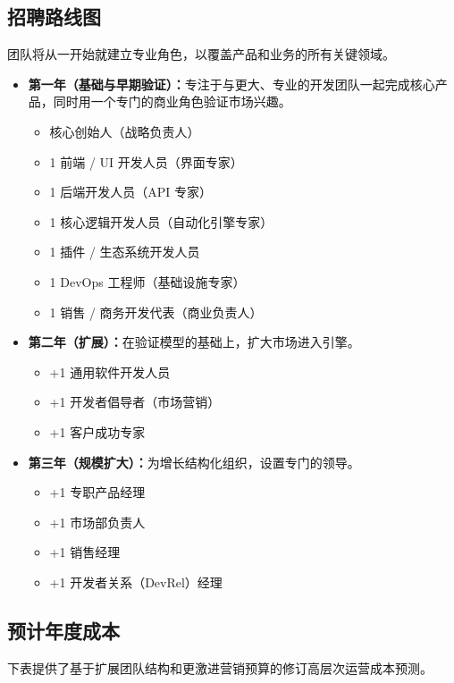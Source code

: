 \documentclass[11pt, a4paper, oneside]{article}
\begin{document}
\subsection*{招聘路线图}
团队将从一开始就建立专业角色，以覆盖产品和业务的所有关键领域。
\begin{itemize}
    \item \textbf{第一年（基础与早期验证）：}专注于与更大、专业的开发团队一起完成核心产品，同时用一个专门的商业角色验证市场兴趣。
    \begin{itemize}
        \item 核心创始人（战略负责人）
        \item 1 前端 / UI 开发人员（界面专家）
        \item 1 后端开发人员（API 专家）
        \item 1 核心逻辑开发人员（自动化引擎专家）
        \item 1 插件 / 生态系统开发人员
        \item 1 DevOps 工程师（基础设施专家）
        \item 1 销售 / 商务开发代表（商业负责人）
    \end{itemize}
    \item \textbf{第二年（扩展）：}在验证模型的基础上，扩大市场进入引擎。
    \begin{itemize}
        \item +1 通用软件开发人员
        \item +1 开发者倡导者（市场营销）
        \item +1 客户成功专家
    \end{itemize}
    \item \textbf{第三年（规模扩大）：}为增长结构化组织，设置专门的领导。
    \begin{itemize}
        \item +1 专职产品经理
        \item +1 市场部负责人
        \item +1 销售经理
        \item +1 开发者关系（DevRel）经理
    \end{itemize}
\end{itemize}

\subsection*{预计年度成本}
下表提供了基于扩展团队结构和更激进营销预算的修订高层次运营成本预测。
\end{document}
